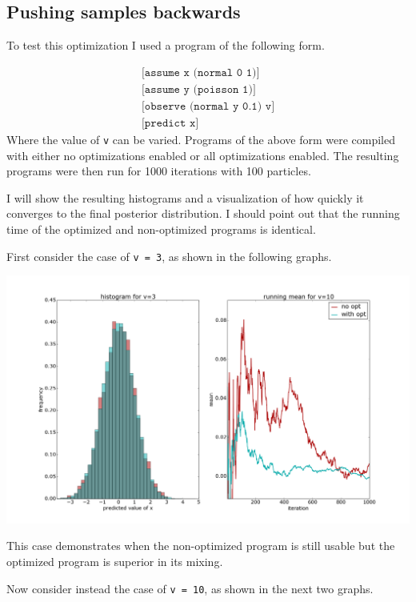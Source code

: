 \documentclass[a4paper]{article}
\begin{document}
\subsection{Pushing samples backwards}

To test this optimization I used a program of the following form.

\[
	\begin{array}{l}
		\texttt{[assume x (normal 0 1)]} \\
		\texttt{[assume y (poisson 1)]} \\
		\texttt{[observe (normal y 0.1) v]} \\
		\texttt{[predict x]}
	\end{array}
\]
Where the value of \texttt{v} can be varied. Programs of the above form were compiled with either no optimizations enabled or all optimizations enabled. The resulting programs were then run for 1000 iterations with 100 particles.

I will show the resulting histograms and a visualization of how quickly it converges to the final posterior distribution. I should point out that the running time of the optimized and non-optimized programs is identical.

First consider the case of \texttt{v = 3}, as shown in the following graphs.

\centerline{\includegraphics[width=16cm]{images/pushing_samples_back_1.png}}

This case demonstrates when the non-optimized program is still usable but the optimized program is superior in its mixing.

Now consider instead the case of \texttt{v = 10}, as shown in the next two graphs.
\end{document}
